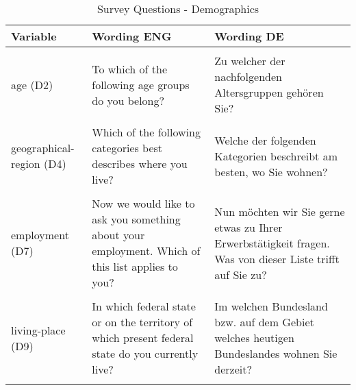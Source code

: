 \documentclass[]{article}
\begin{document}
\begin{table}[!h]
\caption{\label{tab:demographics}\label{tab:demographics}Survey Questions - Demographics}
\centering
\begin{tabular}[t]{>{\raggedright\arraybackslash}p{3cm}>{\raggedright\arraybackslash}p{7cm}>{\raggedright\arraybackslash}p{7cm}}
\toprule
Variable & Wording ENG & Wording DE\\
\midrule
\cellcolor{gray!6}{gender (D1)} & \cellcolor{gray!6}{Which gender do you feel you belong to?} & \cellcolor{gray!6}{Welchem Geschlecht fühlen Sie sich zugehörig?}\\
age (D2) & To which of the following age groups do you belong? & Zu welcher der nachfolgenden Altersgruppen gehören Sie?\\
\cellcolor{gray!6}{education (D3)} & \cellcolor{gray!6}{What is your highest educational qualification?} & \cellcolor{gray!6}{Was ist Ihr höchster Bildungsabschluss?}\\
geographical-region (D4) & Which of the following categories best describes where you live? & Welche der folgenden Kategorien beschreibt am besten, wo Sie wohnen?\\
\cellcolor{gray!6}{vote-recall2 (D6)} & \cellcolor{gray!6}{Which party did you vote for with your second vote in the last federal election in September 2021?} & \cellcolor{gray!6}{Welche Partei haben Sie bei der letzten Bundestagswahl im September 2021 mit Ihrer Zweitstimme gewählt?}\\
\addlinespace
employment (D7) & Now we would like to ask you something about your employment. Which of this list applies to you? & Nun möchten wir Sie gerne etwas zu Ihrer Erwerbstätigkeit fragen. Was von dieser Liste trifft auf Sie zu?\\
\cellcolor{gray!6}{income (D8)} & \cellcolor{gray!6}{What is the total monthly net income of your household? This refers to the sum that remains after deducting taxes and social security contributions.} & \cellcolor{gray!6}{Wie hoch ist das monatliche Netto-Einkommen Ihres Haushaltes insgesamt? Gemeint ist die Summe, die nach Abzug von Steuern und Sozialversicherungsbeiträgen übrig bleibt.}\\
living-place (D9) & In which federal state or on the territory of which present federal state do you currently live? & Im welchen Bundesland bzw. auf dem Gebiet welches heutigen Bundeslandes wohnen Sie derzeit?\\
\cellcolor{gray!6}{birth-place (D10)} & \cellcolor{gray!6}{And in which federal state or on the territory of which present federal state were you born?} & \cellcolor{gray!6}{Und in welchem Bundesland bzw. auf dem Gebiet welches heutigen Bundeslandes wurden Sie geboren?}\\
\bottomrule
\end{tabular}
\end{table}
\end{document}
